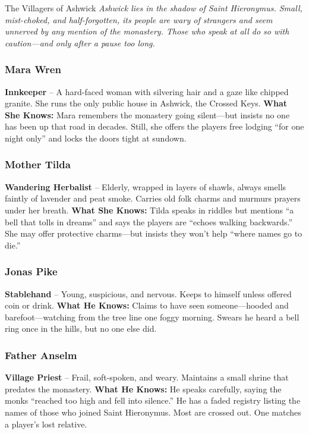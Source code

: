 \documentclass[nodeprecatedcode,bg=print]{dndbook/dndbook}
\begin{document}
\begin{WyrdFullNPC}[%
    name=The Villagers of Ashwick,%
    description=The last voices before the silence,%
    float=!t%
]{The Villagers of Ashwick}
    \emph{Ashwick lies in the shadow of Saint Hieronymus. Small, mist-choked, and half-forgotten, its people are wary of strangers and seem unnerved by any mention of the monastery. Those who speak at all do so with caution—and only after a pause too long.}

    \vspace{0.5\baselineskip}
    \subsubsection*{Mara Wren}
    \textbf{Innkeeper} – A hard-faced woman with silvering hair and a gaze like chipped granite. She runs the only public house in Ashwick, the Crossed Keys.
    \textbf{What She Knows:} Mara remembers the monastery going silent—but insists no one has been up that road in decades. Still, she offers the players free lodging “for one night only” and locks the doors tight at sundown.

    \vspace{0.5\baselineskip}
    \subsubsection*{Mother Tilda}
    \textbf{Wandering Herbalist} – Elderly, wrapped in layers of shawls, always smells faintly of lavender and peat smoke. Carries old folk charms and murmurs prayers under her breath.
    \textbf{What She Knows:} Tilda speaks in riddles but mentions “a bell that tolls in dreams” and says the players are “echoes walking backwards.” She may offer protective charms—but insists they won’t help “where names go to die.”

    \vspace{0.5\baselineskip}
    \subsubsection*{Jonas Pike}
    \textbf{Stablehand} – Young, suspicious, and nervous. Keeps to himself unless offered coin or drink.
    \textbf{What He Knows:} Claims to have seen someone—hooded and barefoot—watching from the tree line one foggy morning. Swears he heard a bell ring once in the hills, but no one else did.

    \vspace{0.5\baselineskip}
    \subsubsection*{Father Anselm}
    \textbf{Village Priest} – Frail, soft-spoken, and weary. Maintains a small shrine that predates the monastery.
    \textbf{What He Knows:} He speaks carefully, saying the monks “reached too high and fell into silence.” He has a faded registry listing the names of those who joined Saint Hieronymus. Most are crossed out. One matches a player’s lost relative.
\end{WyrdFullNPC}
\end{document}
